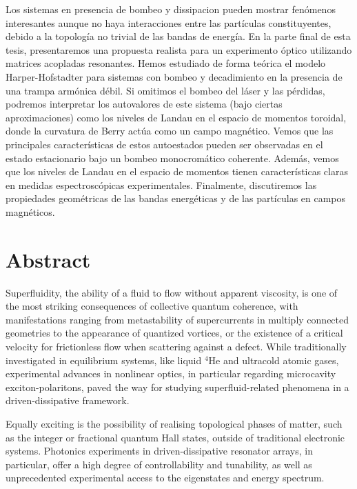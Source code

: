 Los sistemas en presencia de bombeo y dissipacion pueden mostrar
fen\'omenos interesantes aunque no haya interacciones entre las
part\'iculas constituyentes, debido a la topolog\'ia no trivial de las
bandas de energ\'ia. En la parte final de esta tesis, presentaremos
una propuesta realista para un experimento \'optico utilizando
matrices acopladas resonantes. Hemos estudiado de forma te\'orica el
modelo Harper-Hofstadter para sistemas con bombeo y decadimiento en
la presencia de una trampa arm\'onica d\'ebil. Si omitimos el bombeo
del l\'aser y las p\'erdidas, podremos interpretar los autovalores de
este sistema (bajo ciertas aproximaciones) como los niveles de Landau
en el espacio de momentos toroidal, donde la curvatura de Berry
act\'ua como un campo magn\'etico. Vemos que las principales
caracter\'isticas de estos autoestados pueden ser observadas en el
estado estacionario bajo un bombeo monocrom\'atico
coherente. Adem\'as, vemos que los niveles de Landau en el espacio de
momentos tienen caracter\'isticas claras en medidas espectrosc\'opicas
experimentales. Finalmente, discutiremos las propiedades geom\'etricas
de las bandas energ\'eticas y de las part\'iculas en campos
magn\'eticos.


\chapter*{Abstract}

Superfluidity, the ability of a fluid to flow without apparent
viscosity, is one of the most striking consequences of collective
quantum coherence, with manifestations ranging from metastability of
supercurrents in multiply connected geometries to the appearance of
quantized vortices, or the existence of a critical velocity for
frictionless flow when scattering against a defect. While
traditionally investigated in equilibrium systems, like liquid
${}^4$He and ultracold atomic gases, experimental advances in
nonlinear optics, in particular regarding microcavity
exciton-polaritons, paved the way for studying superfluid-related
phenomena in a driven-dissipative framework.

Equally exciting is the possibility of realising topological phases of
matter, such as the integer or fractional quantum Hall states, outside
of traditional electronic systems. Photonics experiments in
driven-dissipative resonator arrays, in particular, offer a high
degree of controllability and tunability, as well as unprecedented
experimental access to the eigenstates and energy spectrum.

